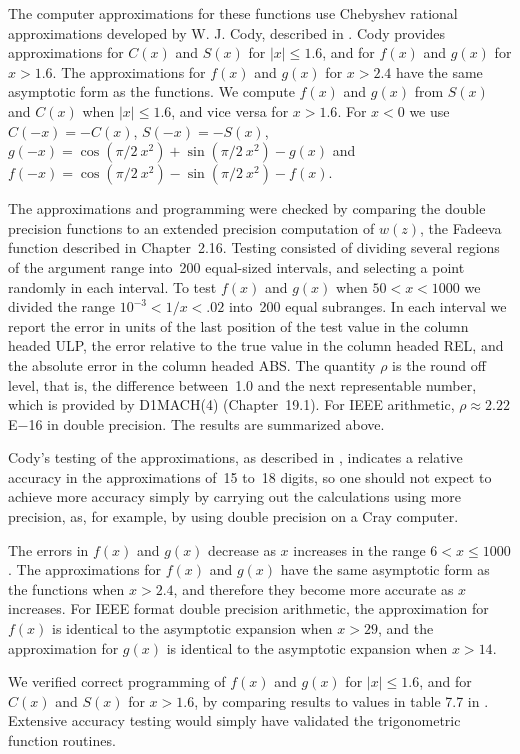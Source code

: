 \documentclass[twoside]{MATH77}
\begin{document}
The computer approximations for these functions use Chebyshev rational
approximations developed by W. J. Cody, described in \cite{Cody:1968:CAF}. Cody
provides approximations for $C(x)$ and $S(x)$ for $|x| \leq 1.6$, and for $%
f(x)$ and $g(x)$ for $x > 1.6$. The approximations for $f(x)$ and $g(x)$ for
$x > 2.4$ have the same asymptotic form as the functions. We compute $f(x)$
and $g(x)$ from $S(x)$ and $C(x)$ when $|x| \leq 1.6$, and vice versa for $x
> 1.6$. For $x < 0$ we use $C(-x) = -C(x)$, $S(-x) = -S(x)$, $g(-x) = \cos
(\pi /2\ x^2) + \sin (\pi /2\ x^2) - g(x)$ and $f(-x) = \cos (\pi /2\ x^2) -
\sin (\pi /2\ x^2) - f(x)$.

The approximations and programming were checked by comparing the double
precision functions to an extended precision computation of $w(z)$, the
Fadeeva function described in Chapter~2.16. Testing consisted of dividing
several regions of the argument range into~200 equal-sized intervals, and
selecting a point randomly in each interval. To test $f(x)$ and $g(x)$ when $%
50 < x < 1000$ we divided the range $10^{-3} < 1/x < .02$ into~200 equal
subranges. In each interval we report the error in units of the last
position of the test value in the column headed ULP, the error relative to
the true value in the column headed REL, and the absolute error in the
column headed ABS. The quantity $\rho $ is the round off level, that is, the
difference between~1.0 and the next representable number, which is provided
by D1MACH(4) (Chapter~19.1). For IEEE arithmetic, $\rho \approx 2.22$E$-$16 in
double precision. The results are summarized above.

Cody's testing of the approximations, as described in \cite{Cody:1968:CAF},
indicates a relative accuracy in the approximations of~15 to~18 digits, so
one should not expect to achieve more accuracy simply by carrying out the
calculations using more precision, as, for example, by using double
precision on a Cray computer.

The errors in $f(x)$ and $g(x)$ decrease as $x$ increases in the range $6 <
x \leq 1000$. The approximations for $f(x)$ and $g(x)$ have the same
asymptotic form as the functions when $x > 2.4$, and therefore they become
more accurate as $x$ increases. For IEEE format double precision arithmetic,
the approximation for $f(x)$ is identical to the asymptotic expansion when $%
x > 29$, and the approximation for $g(x)$ is identical to the asymptotic
expansion when $x > 14.$

We verified correct programming of $f(x)$ and $g(x)$ for $|x| \leq 1.6$, and
for $C(x)$ and $S(x)$ for $x > 1.6$, by comparing results to values in table
7.7 in \cite{ams55}. Extensive accuracy testing would simply have validated
the trigonometric function routines.
\end{document}

